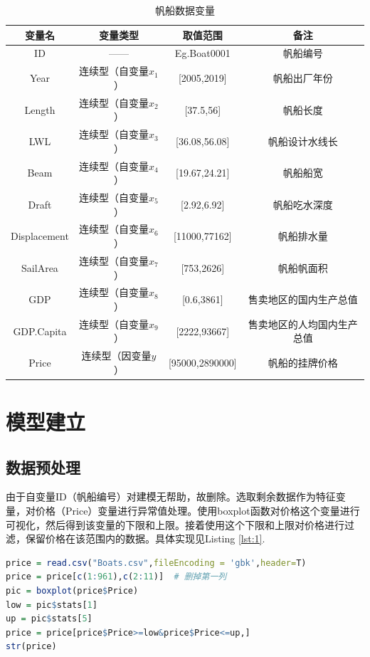 \documentclass[a4paper,12pt,onecolumn,oneside]{article}
\begin{document}
	\begin{table}[h]
		\centering
		\caption{帆船数据变量}
		\vspace{0.25\baselineskip}
		\label{tab:boat-variables}
		\begin{tabular}{cccc}
			\toprule
			变量名 & 变量类型 & 取值范围 & 备注 \\ \midrule
			ID & —— & Eg.Boat0001 & 帆船编号 \\ 
			Year & 连续型（自变量$x_1$） & [2005,2019] & 帆船出厂年份 \\ 
			Length & 连续型（自变量$x_2$） & [37.5,56] & 帆船长度 \\ 
			LWL & 连续型（自变量$x_3$） & [36.08,56.08] & 帆船设计水线长 \\ 
			Beam & 连续型（自变量$x_4$） & [19.67,24.21] & 帆船船宽 \\ 
			Draft & 连续型（自变量$x_5$） & [2.92,6.92] & 帆船吃水深度 \\ 
			Displacement & 连续型（自变量$x_6$） & [11000,77162] & 帆船排水量 \\ 
			SailArea & 连续型（自变量$x_7$） & [753,2626] & 帆船帆面积 \\ 
			GDP & 连续型（自变量$x_8$） & [0.6,3861] & 售卖地区的国内生产总值 \\ 
			GDP.Capita & 连续型（自变量$x_9$） & [2222,93667] & 售卖地区的人均国内生产总值 \\ \hline
			Price & 连续型（因变量$y$） & [95000,2890000] & 帆船的挂牌价格 \\ \bottomrule
		\end{tabular}
	\end{table}
	
	\section{模型建立}  %
	\subsection{数据预处理}  %
	由于自变量ID（帆船编号）对建模无帮助，故删除。选取剩余数据作为特征变量，对价格（Price）变量进行异常值处理。使用boxplot函数对价格这个变量进行可视化，然后得到该变量的下限和上限。接着使用这个下限和上限对价格进行过滤，保留价格在该范围内的数据。具体实现见Listing \ref{lst:1}.
	\begin{lstlisting}[language=R, caption={异常值处理}, label={lst:1},belowcaptionskip=0.5\baselineskip]
price = read.csv("Boats.csv",fileEncoding = 'gbk',header=T)
price = price[c(1:961),c(2:11)]  # 删掉第一列
pic = boxplot(price$Price)
low = pic$stats[1]
up = pic$stats[5]
price = price[price$Price>=low&price$Price<=up,]
str(price)
	\end{lstlisting}  
\end{document}
